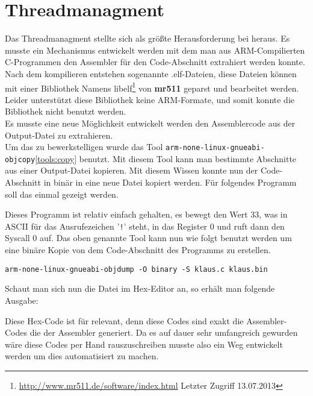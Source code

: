 \section{Threadmanagment}
Das Threadmanagment stellte sich als gr\"o\ss te Herausforderung bei \mops heraus. Es musste ein Mechanismus entwickelt werden mit dem man aus ARM-Compilierten C-Programmen den Assembler f\"ur den Code-Abschnitt extrahiert werden konnte. Nach dem kompilieren entstehen sogenannte .elf-Dateien, diese Dateien k\"onnen mit einer Bibliothek Namens libelf\footnote{\url{http://www.mr511.de/software/index.html} Letzter Zugriff 13.07.2013} von \textbf{mr511} geparst und bearbeitet werden. Leider unterst\"utzt diese Bibliothek keine ARM-Formate, und somit konnte die Bibliothek nicht benutzt werden.\\
Es musste eine neue M\"oglichkeit entwickelt werden den Assemblercode aus der Output-Datei zu extrahieren.\\
Um das zu bewerkstelligen wurde das Tool \texttt{arm-none-linux-gnueabi-objcopy}\ref{tools:copy} benutzt. Mit diesem Tool kann man bestimmte Abschnitte aus einer Output-Datei kopieren. Mit diesem Wissen konnte nun der Code-Abschnitt in bin\"ar in eine neue Datei kopiert werden. F\"ur folgendes Programm soll das einmal gezeigt werden.
\newpage

Dieses Programm ist relativ einfach gehalten, es bewegt den Wert 33, was in ASCII f\"ur das Ausrufezeichen '\texttt{!}' steht, in das Register 0 und ruft dann den Syscall 0 auf.
Das oben genannte Tool kann nun wie folgt benutzt werden um eine bin\"are Kopie von dem Code-Abschnitt des Programms zu erstellen.
\begin{lstlisting}
arm-none-linux-gnueabi-objdump -O binary -S klaus.c klaus.bin
\end{lstlisting}
Schaut man sich nun die Datei im Hex-Editor an, so erh\"alt man folgende Ausgabe:

Diese Hex-Code ist f\"ur \mops relevant, denn diese Codes sind exakt die Assembler-Codes die der Assembler generiert. Da es auf dauer sehr umfangreich gewurden w\"are diese Codes per Hand rauszuschreiben musste also ein Weg entwickelt werden um dies automatisiert zu machen.
